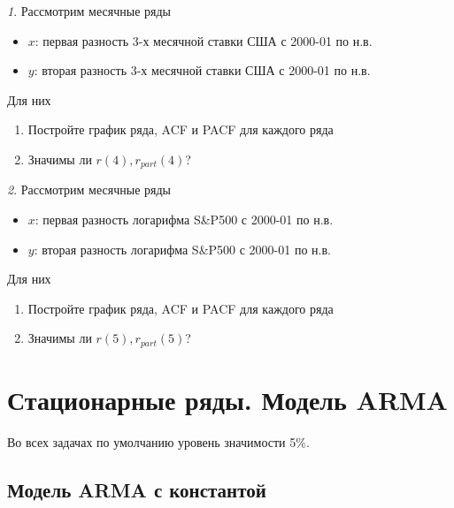 \documentclass[12pt]{article}
\theoremstyle{remark}
\newtheorem{exercise}{}[subsection]
\begin{document}
\begin{exercise}
Рассмотрим месячные ряды
\begin{itemize}
	\item \(x\): первая разность 3-х месячной ставки США с 2000-01 по
	н.в.
	\item \(y\): вторая разность 3-х месячной ставки США с 2000-01 по
	н.в.
\end{itemize}
Для них
\begin{enumerate}
	\item Постройте график ряда, ACF и PACF для каждого ряда
	\item Значимы ли \(r(4),r_{part}(4)\)?
\end{enumerate}
\end{exercise}

\begin{exercise}
Рассмотрим месячные ряды
\begin{itemize}
	\item \(x\): первая разность логарифма S\&P500 с 2000-01 по
	н.в.
	\item \(y\): вторая разность логарифма S\&P500 с 2000-01 по
	н.в.
\end{itemize}
Для них
\begin{enumerate}
	\item Постройте график ряда, ACF и PACF для каждого ряда
	\item Значимы ли \(r(5),r_{part}(5)\)?
\end{enumerate}
\end{exercise}

\section{Стационарные ряды. Модель ARMA}

Во всех задачах по умолчанию уровень значимости 5\%.


\subsection{Модель ARMA с константой}
\end{document}

